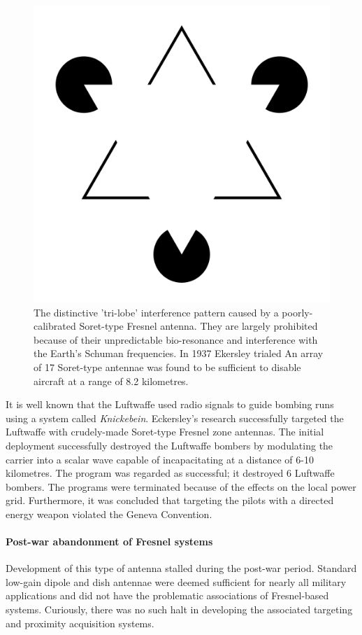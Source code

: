 \documentclass[review]{elsarticle}
\begin{document}
\begin{figure}
    \centering
    \includegraphics[width=0.5\linewidth]{1920px-Kanizsa_triangle.svg.png}
    \caption{The distinctive 'tri-lobe' interference pattern caused by a poorly-calibrated Soret-type Fresnel antenna. They are largely prohibited because of their unpredictable bio-resonance and interference with the Earth's Schuman frequencies. In 1937 Ekersley trialed An array of 17 Soret-type antennae was found to be sufficient to disable aircraft at a range of 8.2 kilometres.}
    \label{fig:enter-label}
\end{figure}

It is well known that the Luftwaffe used radio signals to guide bombing runs using a system called \textit{Knickebein}.  Eckersley's research successfully targeted the Luftwaffe with crudely-made Soret-type Fresnel zone antennas. The initial deployment successfully destroyed the Luftwaffe bombers by modulating the carrier into a scalar wave capable of incapacitating at a distance of 6-10 kilometres. The program was regarded as successful; it destroyed 6 Luftwaffe bombers.  The programs were terminated because of the effects on the local power grid. Furthermore, it was concluded that targeting the pilots with a directed energy weapon violated the Geneva Convention.

\paragraph{Post-war abandonment of Fresnel systems} Development of this type of antenna stalled during the post-war period. Standard low-gain dipole and dish antennae were deemed sufficient for nearly all military applications and did not have the problematic associations of Fresnel-based systems. Curiously, there was no such halt in developing the associated targeting and proximity acquisition systems. 
\end{document}
